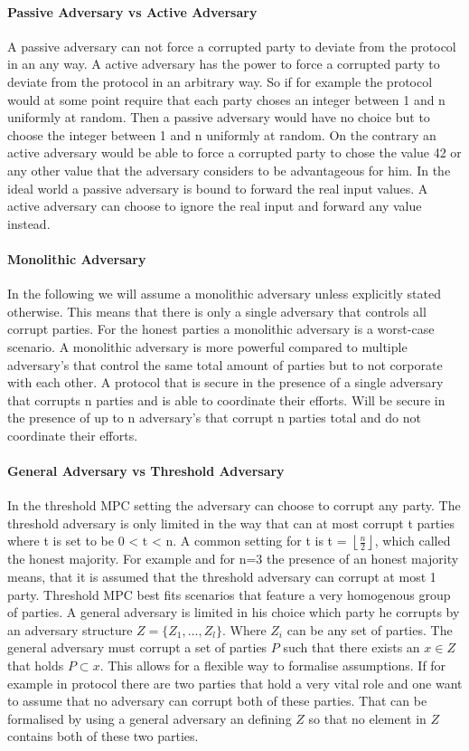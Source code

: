 \paragraph{Passive Adversary vs Active Adversary}
A passive adversary can not force a corrupted party to deviate from the protocol in an any way.  A active adversary has the power to force a corrupted party to deviate from the protocol in an arbitrary way. So if for example the protocol would at some point require that each party choses an integer between 1 and n uniformly at random.  Then a passive adversary would have no choice but to choose the integer between 1 and n uniformly at random. On the contrary an active adversary would be able to force a corrupted party to chose the value 42 or any other value that the adversary considers to be advantageous for him. In the ideal world a passive adversary is bound to forward the real input values. A active adversary can choose to ignore the real input and forward any value instead.

\paragraph{Monolithic Adversary}
In the following we will assume a monolithic adversary unless explicitly stated otherwise. This means that there is only a single adversary that controls all corrupt parties. For the honest parties a monolithic adversary is a worst-case scenario. A monolithic adversary is more powerful compared to multiple adversary's that control the same total amount of parties but to not corporate with each other. A protocol that is secure in the presence of a single adversary that corrupts n parties and is able to coordinate their efforts. Will be secure in the presence of up to n adversary's that corrupt n parties total and do not coordinate their efforts.   
\paragraph{General Adversary vs Threshold Adversary}
In the threshold MPC setting the adversary can choose to corrupt any party. The threshold adversary is only limited in the way that can at most corrupt t parties where t is set to be 0 < t < n. A common setting for t is t = $\left \lfloor{ \frac{n}{2} }\right \rfloor  $, which called the honest majority. For example and for n=3 the presence of an honest majority means, that it is assumed that the threshold adversary can corrupt at most 1 party. Threshold MPC best fits scenarios that feature a very homogenous group of parties. A general adversary is limited in his choice which party he corrupts by an adversary structure  
$ Z = \{ Z_1, \dots, Z_l  \} $. Where $ Z_i $ can be any set of parties. The general adversary must corrupt a set of parties  $ P $ such that there exists an $ x \in Z $ that holds $ P \subset x $. This allows for a flexible way to formalise assumptions. If for example in protocol there are two parties that hold a very vital role and one want to assume that no adversary can corrupt both of these parties. That can be formalised by using a general adversary an defining $ Z $ so that no element in  $Z $ contains both of these two parties.  
 
